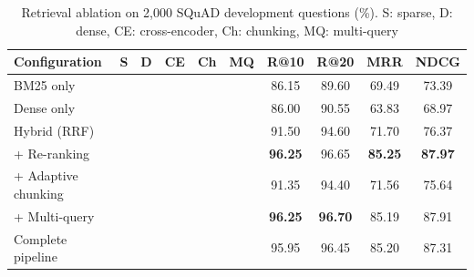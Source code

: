 \documentclass[conference]{IEEEtran}
\newcommand{\cm}{\checkmark}
\newcommand{\best}[1]{\textbf{#1}}
\begin{document}
\begin{table}[t]
\centering
\caption{Retrieval ablation on 2,000 SQuAD development questions (\%). S: sparse, D: dense,
CE: cross-encoder, Ch: chunking, MQ: multi-query}
\label{tab:retrieval}
\footnotesize
\setlength{\tabcolsep}{2.6pt}
\begin{tabular}{@{}lccccccccc@{}}
\toprule
\textbf{Configuration} & S & D & CE & Ch & MQ & \textbf{R@10} & \textbf{R@20} & \textbf{MRR} & \textbf{NDCG} \\
\midrule
BM25 only          & \cm &     &     &     &     & 86.15 & 89.60 & 69.49 & 73.39 \\
Dense only         &     & \cm &     &     &     & 86.00 & 90.55 & 63.83 & 68.97 \\
Hybrid (RRF)       & \cm & \cm &     &     &     & 91.50 & 94.60 & 71.70 & 76.37 \\
+ Re-ranking       & \cm & \cm & \cm &     &     & \best{96.25} & 96.65 & \best{85.25} & \best{87.97} \\
+ Adaptive chunking& \cm & \cm &     & \cm &     & 91.35 & 94.40 & 71.56 & 75.64 \\
+ Multi-query      & \cm & \cm & \cm &     & \cm & \best{96.25} & \best{96.70} & 85.19 & 87.91 \\
Complete pipeline  & \cm & \cm & \cm & \cm & \cm & 95.95 & 96.45 & 85.20 & 87.31 \\
\bottomrule
\end{tabular}
\end{table}
\end{document}
